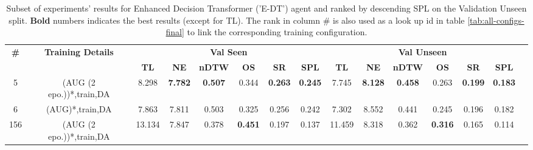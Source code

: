 \begin{table}
\centering
\caption{\label{tab:e_dt_dagger_envdrop}Subset of experiments' results for Enhanced Decision Transformer ('E-DT') agent and ranked by descending SPL on the Validation Unseen split. \textbf{Bold} numbers indicates the best results (except for TL). The rank in column \# is also used as a look up id in table \ref{tab:all-configs-final} to link the corresponding training configuration.}
\begin{tabular}{@{\hskip3pt}c@{\hskip3pt}c@{\hskip3pt}c@{\hskip3pt}c@{\hskip3pt}c@{\hskip3pt}c@{\hskip3pt}c@{\hskip3pt}c@{\hskip3pt}c@{\hskip3pt}c@{\hskip3pt}c@{\hskip3pt}c@{\hskip3pt}c@{\hskip3pt}c@{\hskip3pt}c}
\toprule
                                  \textbf{\#} & \textbf{Training Details} & \multicolumn{6}{c}{\textbf{Val Seen}} & \multicolumn{6}{c}{\textbf{Val Unseen}} \\
\cmidrule(l){3-8}\cmidrule(l){9-14}\textbf{~} &                \textbf{~} &       \textbf{TL} &     \textbf{NE} &   \textbf{nDTW} &     \textbf{OS} &     \textbf{SR} &    \textbf{SPL} &         \textbf{TL} &     \textbf{NE} &   \textbf{nDTW} &     \textbf{OS} &     \textbf{SR} &    \textbf{SPL} \\
\midrule
                                            5 &  (AUG (2 epo.))*,train,DA &             8.298 &  \textbf{7.782} &  \textbf{0.507} &           0.344 &  \textbf{0.263} &  \textbf{0.245} &               7.745 &  \textbf{8.128} &  \textbf{0.458} &           0.263 &  \textbf{0.199} &  \textbf{0.183} \\
                                            6 &           (AUG)*,train,DA &             7.863 &           7.811 &           0.503 &           0.325 &           0.256 &           0.242 &               7.302 &           8.552 &           0.441 &           0.245 &           0.196 &           0.182 \\
                                          156 &  (AUG (2 epo.))*,train,DA &            13.134 &           7.847 &           0.378 &  \textbf{0.451} &           0.197 &           0.137 &              11.459 &           8.318 &           0.362 &  \textbf{0.316} &           0.165 &           0.114 \\
\bottomrule
\end{tabular}
\end{table}
